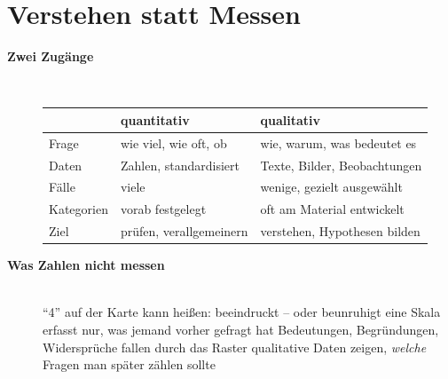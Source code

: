 \section{Verstehen statt Messen}
\begin{description}
\item[{\rot\bf Zwei Zugänge}]~\\[-\lblskip]
\begin{center}
\small
\begin{tabular}{@{}p{}p{}p{}@{}}
\toprule
 & \textbf{quantitativ} & \textbf{qualitativ} \\
\midrule
Frage & wie viel, wie oft, ob & wie, warum, was bedeutet es \\
Daten & Zahlen, standardisiert & Texte, Bilder, Beobachtungen \\
Fälle & viele & wenige, gezielt ausgewählt \\
Kategorien & vorab festgelegt & oft am Material entwickelt \\
Ziel & prüfen, verallgemeinern & verstehen, Hypothesen bilden \\
\bottomrule
\end{tabular}
\end{center}
\os{\newpage}

\item[{\rot\bf Was Zahlen nicht messen}]~\\[-\lblskip]
\bi
  \ite \enquote{4} auf der Karte kann heißen: beeindruckt -- oder
    beunruhigt
  \ite eine Skala erfasst nur, was jemand vorher gefragt hat
  \ite Bedeutungen, Begründungen, Widersprüche fallen durch das Raster
  \ite qualitative Daten zeigen, \emph{welche} Fragen man später zählen
    sollte
\ei
\os{\newpage}
\end{description}

